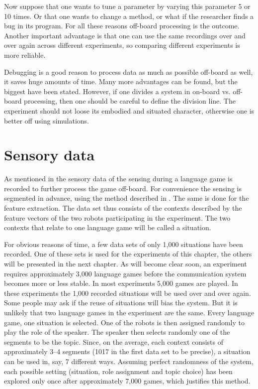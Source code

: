Now suppose that one wants to tune a parameter by varying this parameter 5 or 10 times. Or that one wants to change a method, or what if the researcher finds a bug in its program. For all these reasons off-board processing is the outcome. Another important advantage is that one can use the same recordings over and over again across different experiments, so comparing different experiments is more reliable.


Debugging is a good reason to process data as much as possible off-board as well, it saves huge amounts of time. Many more advantages can be found, but the biggest have been stated. However, if one divides a system in on-board vs. off-board processing, then one should be careful to define the division line. The experiment should not loose its embodied and situated character, otherwise one is better off using simulations.


\section{Sensory data}\label{s:st:data}

As mentioned in  the sensory data of the
sensing during a language game is recorded to further
process the game off-board. For convenience the sensing is segmented in advance, using the method
described in . The same is done for the feature extraction. The data set thus consists of
the contexts described by the feature vectors of the two robots participating in the experiment. The two contexts that relate to one language game will be called a {\sc situation}.


For obvious reasons of time, a few data sets of only 1,000
situations have been recorded. One of these sets is used for the experiments of this chapter, the others will be presented in the next chapter. As will become clear soon,
an experiment requires approximately 3,000 language
games before the communication system becomes more or less stable. In most experiments 5,000 games are played. In these experiments the
1,000 recorded situations will be used over and over again. Some people may ask if the reuse of situations will bias the system. But it is unlikely that two language games in the experiment are the same.
Every language game, one situation is selected. One of the
robots is then assigned randomly to play the role of the
speaker. The speaker then selects randomly one of the segments
to be the topic. Since, on the average, each context consists
of approximately 3--4 segments (1017 in the first data set to be
precise), a situation can be used in, say, 7 different ways. Assuming
perfect randomness of the system, each possible setting
(situation, role assignment and topic choice) has been explored only once
after approximately 7,000 games, which justifies this method. 

